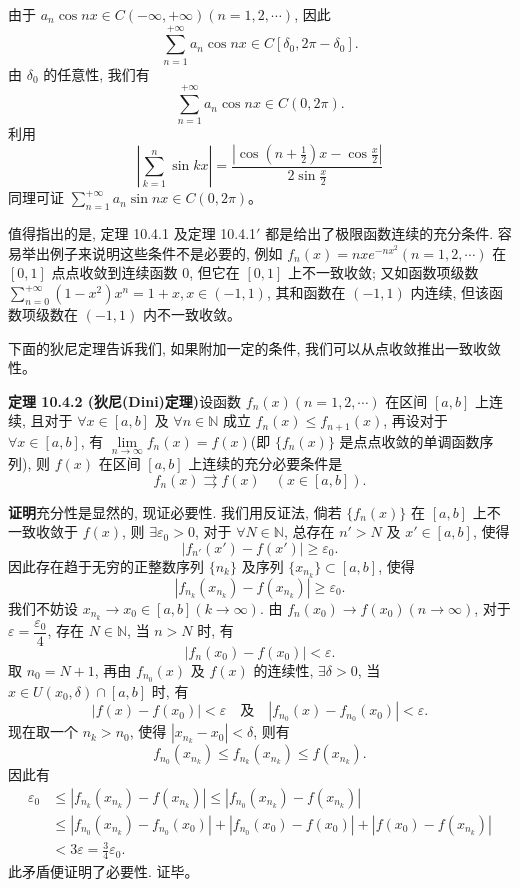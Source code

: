 \documentclass[UTF8, 12pt, fontset=fandol, oneside]{ctexart}
\begin{document}
由于 $a_n\cos nx\in C(-\infty,+\infty)(n=1,2,\cdots)$, 因此
\[
  \sum_{n=1}^{+\infty}a_n\cos nx\in C[\delta_0,2\pi-\delta_0].
\]
由 $\delta_0$ 的任意性, 我们有
\[
  \sum_{n=1}^{+\infty}a_n\cos nx\in C(0,2\pi).
\]
利用
\[
  \left|\sum_{k=1}^n\sin kx\right|
  =\frac{\left|\cos\left(n+\frac12\right)x-\cos\frac{x}{2}\right|}{2\sin\frac{x}{2}}
\]
同理可证 $\sum\limits_{n=1}^{+\infty}a_n\sin nx\in C(0,2\pi)$。

值得指出的是, 定理 10.4.1 及定理 10.4.1$'$ 都是给出了极限函数连续的充分条件. 容易举出例子来说明这些条件不是必要的, 例如 $f_n(x)=nxe^{-nx^2}(n=1,2,\cdots)$ 在 $[0,1]$ 点点收敛到连续函数 $0$, 但它在 $[0,1]$ 上不一致收敛; 又如函数项级数 $\sum\limits_{n=0}^{+\infty}(1-x^2)x^n=1+x, x\in(-1,1)$, 其和函数在 $(-1,1)$ 内连续, 但该函数项级数在 $(-1,1)$ 内不一致收敛。

下面的狄尼定理告诉我们, 如果附加一定的条件, 我们可以从点收敛推出一致收敛性。

\noindent\textbf{定理 10.4.2 (狄尼(Dini)定理)}\quad 设函数 $f_n(x)(n=1,2,\cdots)$ 在区间 $[a,b]$ 上连续, 且对于 $\forall x\in[a,b]$ 及 $\forall n\in\mathbb N$ 成立 $f_n(x)\leq f_{n+1}(x)$, 再设对于 $\forall x\in[a,b]$, 有 $\lim\limits_{n\to\infty}f_n(x)=f(x)$(即 $\{f_n(x)\}$ 是点点收敛的单调函数序列), 则 $f(x)$ 在区间 $[a,b]$ 上连续的充分必要条件是
\[
  f_n(x)\rightrightarrows f(x)\quad(x\in[a,b]).
\]

\noindent\textbf{证明}\quad 充分性是显然的, 现证必要性. 我们用反证法, 倘若 $\{f_n(x)\}$ 在 $[a,b]$ 上不一致收敛于 $f(x)$, 则 $\exists\varepsilon_0>0$, 对于 $\forall N\in\mathbb N$, 总存在 $n'>N$ 及 $x'\in[a,b]$, 使得
\[
  |f_{n'}(x')-f(x')|\geq\varepsilon_0.
\]
因此存在趋于无穷的正整数序列 $\{n_k\}$ 及序列 $\{x_{n_k}\}\subset[a,b]$, 使得
\[
  |f_{n_k}(x_{n_k})-f(x_{n_k})|\geq\varepsilon_0.
\]
我们不妨设 $x_{n_k}\to x_0\in[a,b](k\to\infty)$. 由 $f_n(x_0)\to f(x_0)(n\to\infty)$, 对于 $\varepsilon=\dfrac{\varepsilon_0}{4}$, 存在 $N\in\mathbb N$, 当 $n>N$ 时, 有
\[
  |f_n(x_0)-f(x_0)|<\varepsilon.
\]
取 $n_0=N+1$, 再由 $f_{n_0}(x)$ 及 $f(x)$ 的连续性, $\exists\delta>0$, 当 $x\in U(x_0,\delta)\cap[a,b]$ 时, 有
\[
  |f(x)-f(x_0)|<\varepsilon\quad\text{及}\quad |f_{n_0}(x)-f_{n_0}(x_0)|<\varepsilon.
\]
现在取一个 $n_k>n_0$, 使得 $|x_{n_k}-x_0|<\delta$, 则有
\[
  f_{n_0}(x_{n_k})\leq f_{n_k}(x_{n_k})\leq f(x_{n_k}).
\]
因此有
\[
\begin{aligned}
  \varepsilon_0
  &\leq |f_{n_k}(x_{n_k})-f(x_{n_k})|
  \leq |f_{n_0}(x_{n_k})-f(x_{n_k})|\\
  &\leq |f_{n_0}(x_{n_k})-f_{n_0}(x_0)|+|f_{n_0}(x_0)-f(x_0)|+|f(x_0)-f(x_{n_k})|\\
  &<3\varepsilon=\frac34\varepsilon_0.
\end{aligned}
\]
此矛盾便证明了必要性. 证毕。
\end{document}
